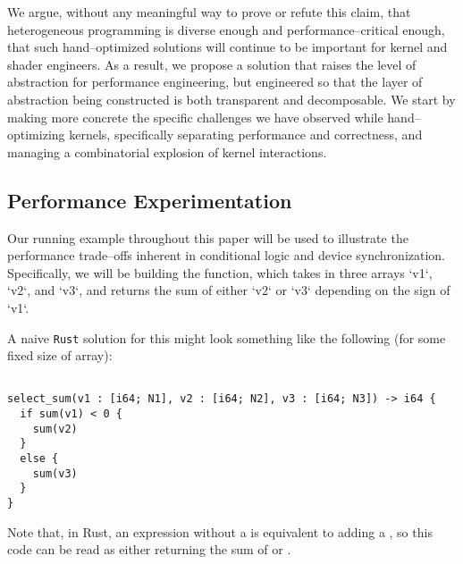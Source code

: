 We argue, without any meaningful way to prove or refute this claim, that heterogeneous programming is diverse enough and performance--critical enough, that such hand--optimized solutions will continue to be important for kernel and shader engineers.  As a result, we propose a solution that raises the level of abstraction for performance engineering, but engineered so that the layer of abstraction being constructed is both transparent and decomposable.  We start by making more concrete the specific challenges we have observed while hand--optimizing kernels, specifically separating performance and correctness, and managing a combinatorial explosion of kernel interactions.

\subsection{Performance Experimentation}
\label{subsec:separation}

Our running example throughout this paper will be used to illustrate the performance trade--offs inherent in conditional logic and device synchronization.  Specifically, we will be building the  function, which takes in three arrays `v1`, `v2`, and `v3`, and returns the sum of either `v2` or `v3` depending on the sign of `v1`.

A naive \texttt{Rust} solution for this might look something like the following (for some fixed size of array):
%
\begin{lstlisting}

select_sum(v1 : [i64; N1], v2 : [i64; N2], v3 : [i64; N3]) -> i64 {
  if sum(v1) < 0 {
    sum(v2)
  }
  else {
    sum(v3)
  }
}
\end{lstlisting}
%
Note that, in Rust, an expression without a \code{;} is equivalent to adding a , so this code can be read as either returning the sum of  or .

